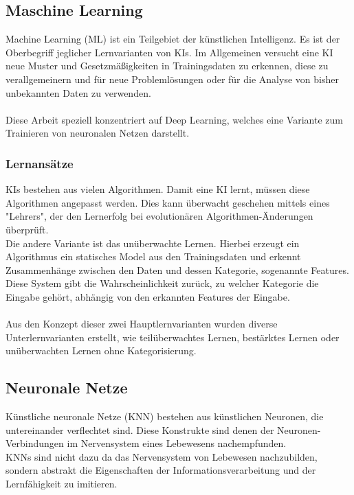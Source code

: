\documentclass[12pt,oneside,a4paper,parskip]{scrbook}
\begin{document}
\subsection{Maschine Learning}
Machine Learning (ML) ist ein Teilgebiet der künstlichen Intelligenz. Es ist der Oberbegriff jeglicher Lernvarianten von KIs. Im Allgemeinen versucht eine KI neue Muster und Gesetzmäßigkeiten in Trainingsdaten zu erkennen, diese zu verallgemeinern und für neue Problemlösungen oder für die Analyse von bisher unbekannten Daten zu verwenden\cite{EliminateHumanBias}.
\\\\Diese Arbeit speziell konzentriert auf Deep Learning, welches eine Variante zum Trainieren von neuronalen Netzen darstellt.
\subsubsection{Lernansätze}
KIs bestehen aus vielen Algorithmen. Damit eine KI lernt, müssen diese Algorithmen angepasst werden. Dies kann überwacht geschehen mittels eines "Lehrers", der den Lernerfolg bei evolutionären Algorithmen-Änderungen überprüft.\\
Die andere Variante ist das unüberwachte Lernen. Hierbei erzeugt ein Algorithmus ein statisches Model aus den Trainingsdaten und erkennt Zusammenhänge zwischen den Daten und dessen Kategorie, sogenannte Features. Diese System gibt die Wahrscheinlichkeit zurück, zu welcher Kategorie die Eingabe gehört, abhängig von den erkannten Features der Eingabe.\\\\
Aus den Konzept dieser zwei Hauptlernvarianten wurden diverse Unterlernvarianten erstellt, wie teilüberwachtes Lernen, bestärktes Lernen oder unüberwachten Lernen ohne Kategorisierung.
\subsection{Neuronale Netze}
Künstliche neuronale Netze (KNN) bestehen aus künstlichen Neuronen, die untereinander verflechtet sind. Diese Konstrukte sind denen der Neuronen-Verbindungen im Nervensystem eines Lebewesens nachempfunden. \\
KNNs sind nicht dazu da das Nervensystem von Lebewesen nachzubilden, sondern abstrakt die Eigenschaften der Informationsverarbeitung und der Lernfähigkeit zu imitieren.\\
\end{document}
